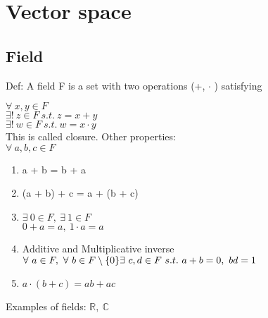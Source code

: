 \documentclass[11pt]{scrartcl}
\begin{document}
\section{Vector space}
\subsection{Field}
Def: A field F is a set with two operations (+, $\cdot$ ) satisfying

\noindent $\forall\ x,y \in F$\\
\-\hspace{1in}$\exists !\ z \in F\ s.t.\ z = x + y$\\
\-\hspace{1in}$\exists !\ w \in F\ s.t.\ w = x \cdot y$\\ 
This is called closure.
\noindent Other properties:\\
$\forall\ a,b,c \in F$
\begin{enumerate}
	\item{a + b = b + a}
	\item{(a + b) + c = a + (b + c)}
	\item{$\exists \ 0 \in F,\ \exists \ 1 \in F$}\\
		$0 + a = a,\ 1 \cdot a = a$ 
	\item{Additive and Multiplicative inverse \\ $\forall \ a \in F,\ \forall \ b \in F \setminus \{0\} \\ \exists \ c,d \in F \ s.t. \ a + b = 0, \ bd = 1$}
	\item{$a \cdot (b + c) = ab + ac$}
\end{enumerate}

Examples of fields: $\mathbb{R},\ \mathbb{C}$
\end{document}
